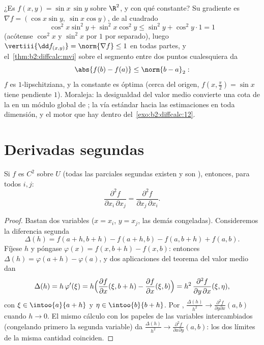 \begin{example}\label{ex:b2:diffcalc:lipschitz}
¿Es $f(x, y) = \sin x\,\sin y$  sobre $\R^2$, y con qué
constante? Su gradiente es $\nabla f = (\cos x\sin y,\ \sin x\cos
y)$, de  al cuadrado
\[
\cos^2x\sin^2y + \sin^2x\cos^2y
\leq \sin^2 y + \cos^2y\cdot 1 = 1
\]
(acótense $\cos^2x$ y $\sin^2x$ por $1$ por separado), luego
$\vertiii{\dd f_{(x,y)}} = \norm{\nabla f} \leq 1$ en todas partes, y
el~\cref{thm:b2:diffcalc:mvi} sobre el segmento entre dos puntos
cualesquiera da
\[
\abs{f(b) - f(a)} \leq \norm{b - a}_2 :
\]
$f$ es $1$-lipschitziana, y la constante es óptima (cerca del origen,
$f(x, \tfrac\pi2) = \sin x$ tiene pendiente $1$). Moraleja: la
desigualdad del valor medio convierte una cota  de la
 en un módulo global de ; la vía estándar hacia
las estimaciones  en toda dimensión, y el motor que hay
dentro del~\cref{exo:b2:diffcalc:12}.
\end{example}

\section{Derivadas segundas}

\begin{theorem}[Schwarz]\label{thm:b2:diffcalc:schwarz}
Si $f$ es $C^2$ sobre $U$ (todas las parciales segundas existen y son
), entonces, para todos $i, j$:
\[
\frac{\partial^2 f}{\partial x_i\,\partial x_j}
= \frac{\partial^2 f}{\partial x_j\,\partial x_i} .
\]
\end{theorem}

\begin{proof}
Bastan dos variables ($x = x_i$, $y = x_j$, las demás congeladas).
Consideremos la diferencia segunda
\[
\Delta(h) = f(a + h, b + h) - f(a + h, b) - f(a, b + h) + f(a,b) .
\]
Fíjese $h$ y póngase $\varphi(x) = f(x, b+h) - f(x, b)$: entonces
$\Delta(h) = \varphi(a + h) - \varphi(a)$, y dos aplicaciones del
teorema del valor medio dan
\[
\Delta(h) = h\,\varphi'(\xi)
= h\Bigl(\frac{\partial f}{\partial x}(\xi, b+h) -
\frac{\partial f}{\partial x}(\xi, b)\Bigr)
= h^2\,\frac{\partial^2 f}{\partial y\,\partial x}(\xi, \eta),
\]
con $\xi \in \intoo{a}{a+h}$ y $\eta \in \intoo{b}{b+h}$. Por
, $\frac{\Delta(h)}{h^2} \to \frac{\partial^2 f}{\partial
y\partial x}(a, b)$ cuando $h \to 0$. El mismo cálculo con los
papeles de las variables intercambiados (congelando primero la
segunda variable) da $\frac{\Delta(h)}{h^2} \to \frac{\partial^2
f}{\partial x \partial y}(a,b)$: los dos límites de la misma cantidad
coinciden.
\end{proof}


